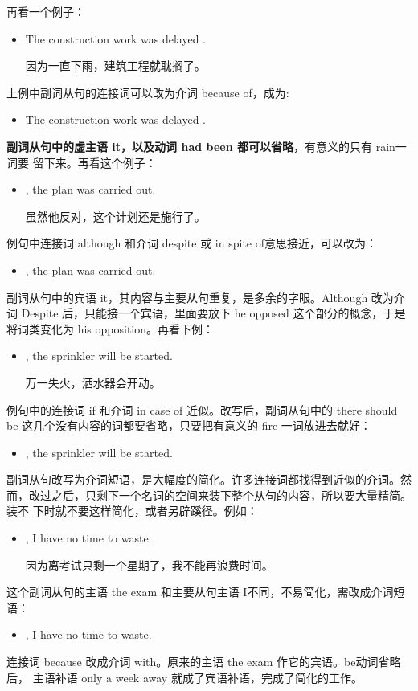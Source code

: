 再看一个例子：
\begin{itemize}
\item The construction work was delayed .

  因为一直下雨，建筑工程就耽搁了。
\end{itemize}
上例中副词从句的连接词可以改为介词 because of，成为:
\begin{itemize}
\item The construction work was delayed .
\end{itemize}
\textbf{副词从句中的虚主语 it，以及动词 had been 都可以省略}，有意义的只有 rain一词要
留下来。再看这个例子：
\begin{itemize}
\item {}, the plan was carried out.

  虽然他反对，这个计划还是施行了。
\end{itemize}
例句中连接词 although 和介词 despite 或 in spite of意思接近，可以改为：
\begin{itemize}
\item {}, the plan was carried out.
\end{itemize}
副词从句中的宾语 it，其内容与主要从句重复，是多余的字眼。Although
改为介词 Despite 后，只能接一个宾语，里面要放下 he opposed
这个部分的概念，于是将词类变化为 his opposition。再看下例：
\begin{itemize}
\item {}, the sprinkler will be started.

  万一失火，洒水器会开动。
\end{itemize}
例句中的连接词 if 和介词 in case of 近似。改写后，副词从句中的 there
should be 这几个没有内容的词都要省略，只要把有意义的 fire
一词放进去就好：
\begin{itemize}
\item {}, the sprinkler will be started.
\end{itemize}

副词从句改写为介词短语，是大幅度的简化。许多连接词都找得到近似的介词。然
而，改过之后，只剩下一个名词的空间来装下整个从句的内容，所以要大量精简。装不
下时就不要这样简化，或者另辟蹊径。例如：
\begin{itemize}
\item {}   , I have no time to waste.

  因为离考试只剩一个星期了，我不能再浪费时间。
\end{itemize}
这个副词从句的主语 the exam 和主要从句主语 I不同，不易简化，需改成介词短
语：
\begin{itemize}
\item {}  , I have
  no time to waste.
\end{itemize}
连接词 because 改成介词 with。原来的主语 the exam 作它的宾语。be动词省略后，
主语补语 only a week away 就成了宾语补语，完成了简化的工作。

